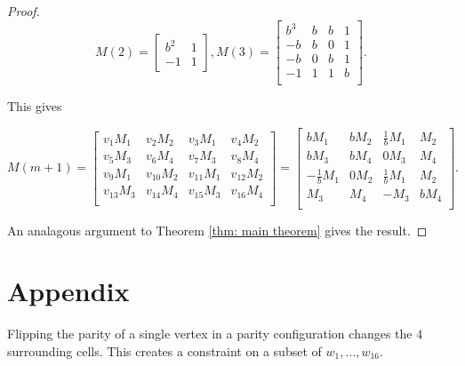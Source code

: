 \documentclass[12pt]{article}
\newtheorem{theorem}{Theorem}
\theoremstyle{plain}
\theoremstyle{definition}
\theoremstyle{remark}
\theoremstyle{definition}
\begin{document}
\begin{proof}
$$M(2) = 
\begin{bmatrix}
    b^2 & 1 \\
    -1 & 1
\end{bmatrix}, M(3)=
\begin{bmatrix}
b^3 & b & b & 1 \\
-b & b & 0 & 1 \\
-b & 0 & b & 1 \\
-1 & 1 & 1 & b \\
\end{bmatrix}.$$

This gives

$$
M(m+1) = 
\begin{bmatrix}
    v_{1}M_1 & v_{2}M_2 & v_{3}M_1 & v_{4}M_2 \\
    v_{5}M_3 & v_{6}M_4 & v_{7}M_3 & v_{8}M_4 \\
    v_{9}M_1 & v_{10}M_2 & v_{11}M_1 & v_{12}M_2 \\
    v_{13}M_3 & v_{14}M_4 & v_{15}M_3 & v_{16}M_4 \\
\end{bmatrix} =
\begin{bmatrix}
bM_1 & bM_2 & \frac{1}{b}M_1 & M_2 \\
bM_3 & bM_4 & 0M_3 & M_4 \\
-\frac{1}{b}M_1 & 0M_2 & \frac{1}{b}M_1 & M_2 \\
M_3 & M_4 & -M_3 & bM_4 \\
\end{bmatrix}.
$$

An analagous argument to Theorem \ref{thm: main theorem} gives the result.

\end{proof}


\section{Appendix}

Flipping the parity of a single vertex in a parity configuration changes the $4$ surrounding cells. This creates a constraint on a subset of $w_1 ,\dots, w_{16}.$ 
\end{document}
